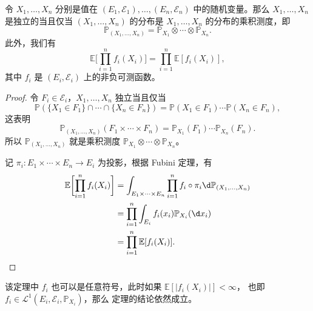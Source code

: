 \documentclass[fontset=none]{Notes}
\begin{document}
\begin{theorem}
  令 $X_1,\dots,X_n$ 分别是值在 $(E_1,\mathcal{E}_1),\dots,(E_n,\mathcal{E}_n)$
  中的随机变量。那么 $X_1,\dots,X_n$ 是独立的当且仅当 $(X_1,\dots,X_n)$
  的分布是 $X_1,\dots,X_n$ 的分布的乘积测度，即
  \[
    \mathbb{P}_{(X_1,\dots,X_n)}=\mathbb{P}_{X_1}\otimes\cdots
    \otimes \mathbb{P}_{X_n}.  
  \]
  此外，我们有
  \[
    \mathbb{E}\biggl[\prod_{i=1}^n f_i(X_i)\biggr] =\prod_{i=1}^n \mathbb{E}[f_i(X_i)],
  \]
  其中 $f_i$ 是 $(E_i,\mathcal{E}_i)$ 上的非负可测函数。
\end{theorem}
\begin{proof}
  令 $F_i\in \mathcal{E}_i$，$X_1,\dots,X_n$ 独立当且仅当
  \[
    \mathbb{P}(\{X_1\in F_1\}\cap\cdots\cap\{X_n\in F_n\})  
    =\mathbb{P}(X_1\in F_1)\cdots \mathbb{P}(X_n\in F_n),
  \]
  这表明
  \[ 
    \mathbb{P}_{(X_1,\dots,X_n)}(F_1\times\cdots\times F_n)
    =\mathbb{P}_{X_1}(F_1)\cdots \mathbb{P}_{X_n}(F_n).
  \]
  所以 $\mathbb{P}_{(X_1,\dots,X_n)}$ 就是乘积测度 
  $\mathbb{P}_{X_1}\otimes\cdots\otimes \mathbb{P}_{X_n}$。

  记 $\pi_i:E_1\times \cdots\times E_n\to E_i$ 为投影，根据 Fubini 定理，有
  \begin{align*}
    \mathbb{E}\biggl[\prod_{i=1}^n f_i(X_i)\biggr]&=
    \int_{E_1\times\cdots \times E_n}\prod_{i=1}^n f_i\circ\pi_i
    \d\mathbb{P}_{(X_1,\dots,X_n)}\\
    &=\prod_{i=1}^n \int_{E_i} f_i(x_i) \mathbb{P}_{X_i}(\d x_i)\\
    &=\prod_{i=1}^n \mathbb{E}[f_i(X_i)].\qedhere
  \end{align*}
\end{proof}
\begin{remark}
  该定理中 $f_i$ 也可以是任意符号，此时如果 $\mathbb{E}[|f_i(X_i)|]<\infty$，
  也即 $f_i\in \mathcal{L}^1(E_i,\mathcal{E}_i,\mathbb{P}_{X_i})$，那么
  定理的结论依然成立。
\end{remark}
\end{document}
